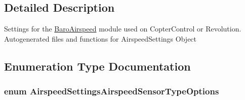 \subsection{\-Detailed \-Description}
\-Settings for the \hyperlink{group___baro_airspeed}{\-Baro\-Airspeed} module used on \-Copter\-Control or \-Revolution. \-Autogenerated files and functions for \-Airspeed\-Settings \-Object 

\subsection{\-Enumeration \-Type \-Documentation}
\hypertarget{group___airspeed_settings_ga7e4f280ca6af021e2cde7b1e7fb7e10b}{
\subsubsection[{\-Airspeed\-Settings\-Airspeed\-Sensor\-Type\-Options}]{\setlength{\rightskip}{0pt plus 5cm}enum {\bf \-Airspeed\-Settings\-Airspeed\-Sensor\-Type\-Options}}}\label{group___airspeed_settings_ga7e4f280ca6af021e2cde7b1e7fb7e10b}
